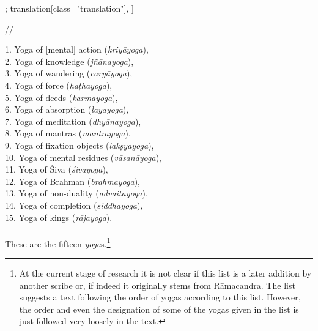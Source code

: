 \documentclass[12pt]{article}%
\begin{document}
\begin{alignment}[
    texts=edition[class="edition"];
    translation[class="translation"],
    ]
\begin{edition}
\begin{prose}
 //\\\end{prose}
    \end{edition}
    \begin{translation}
\begin{tlate}1. Yoga of [mental] action (\textit{kriyāyoga}), \\ 2. Yoga of knowledge (\textit{jñānayoga}),\\ 3. Yoga of wandering (\textit{caryāyoga}),\\ 4. Yoga of force (\textit{haṭhayoga}),\\ 5. Yoga of deeds (\textit{karmayoga}),\\ 6. Yoga of absorption (\textit{layayoga}),\\ 7. Yoga of meditation (\textit{dhyānayoga}),\\ 8. Yoga of mantras (\textit{mantrayoga}),\\ 9. Yoga of fixation objects (\textit{lakṣyayoga}),\\ 10. Yoga of mental residues (\textit{vāsanāyoga}),\\ 11. Yoga of Śiva (\textit{śivayoga}),\\ 12. Yoga of Brahman (\textit{brahmayoga}),\\ 13. Yoga of non-duality (\textit{advaitayoga}),\\ 14. Yoga of completion (\textit{siddhayoga}),\\ 15. Yoga of kings (\textit{rājayoga}).\\ \\ These are the fifteen \textit{yoga}s.\footnote{At the current stage of research it is not clear if this list is a later addition by another scribe or, if indeed it originally stems from Rāmacandra. The list suggests a text following the order of yogas according to this list. However, the order and even the designation of some of the yogas given in the list is just followed very loosely in the text.}\bigskip \end{tlate}
    \end{translation}
    \end{alignment}
\end{document}
